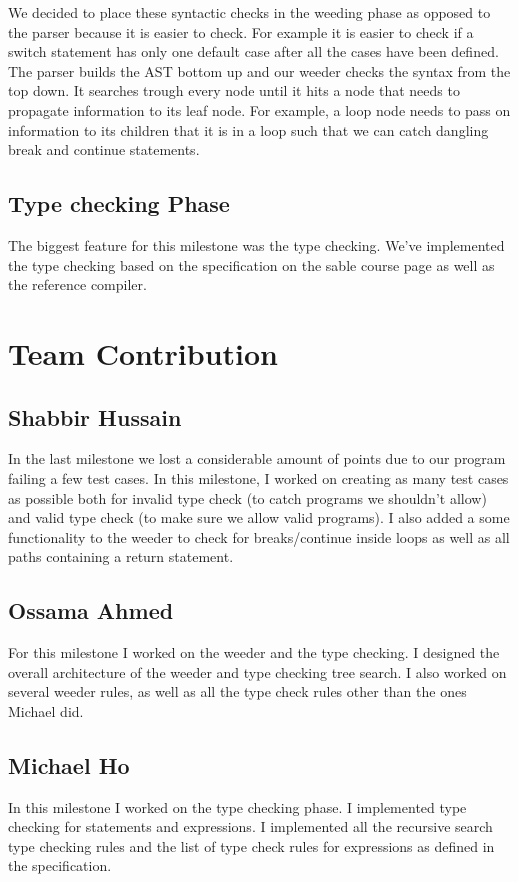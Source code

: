 \documentclass{article}
\begin{document}
We decided to place these syntactic checks in the weeding phase as opposed to the parser because it is easier to check. For example it is easier to check if  a switch statement has only one default case after all the cases have been defined. The parser builds the AST bottom up and our weeder checks the syntax from the top down. It searches trough every node until it hits a node that needs to propagate information to its leaf node. For example, a loop node needs to pass on information to its children that it is in a loop such that we can catch dangling break and continue statements. 

\subsection{Type checking Phase}
The biggest feature for this milestone was the type checking. We've implemented the type checking based on the specification on the sable course page as well as the reference compiler. 


\section{Team Contribution}

\subsection{Shabbir Hussain}
In the last milestone we lost a considerable amount of points due to our program failing a few test cases. In this milestone, I worked on creating as many test cases as possible both for invalid type check (to catch programs we shouldn't allow) and valid type check  (to make sure we allow valid programs). I also added a some functionality to the weeder to check for breaks/continue inside loops as well as all paths containing a return statement.

\subsection{Ossama Ahmed}
For this milestone I worked on the weeder and the type checking. I designed the overall architecture of the weeder and type checking tree search. I also worked on several weeder rules, as well as all the type check rules other than the ones Michael did. 

\subsection{Michael Ho}
In this milestone I worked on the type checking phase. I implemented type checking for statements and expressions. I implemented all the recursive search type checking rules and the list of type check rules for expressions as defined in the specification. 


\end{document}
